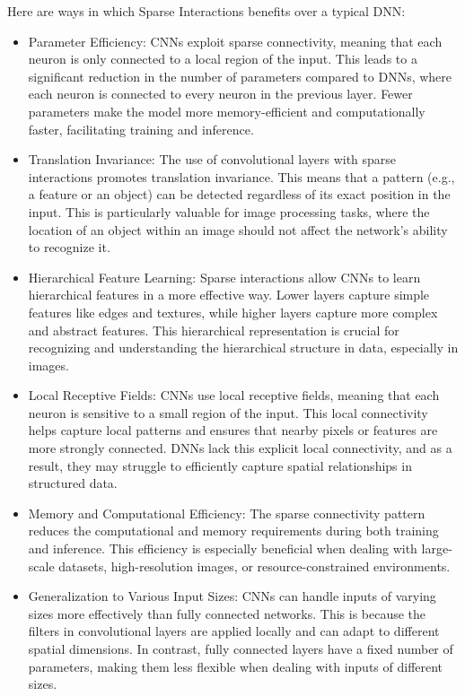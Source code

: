 \documentclass{report}
\begin{document}
Here are ways in which Sparse Interactions benefits over a typical DNN:
\begin{itemize}
\item Parameter Efficiency:
CNNs exploit sparse connectivity, meaning that each neuron is only connected to a local region of the input. This leads to a significant reduction in the number of parameters compared to DNNs, where each neuron is connected to every neuron in the previous layer. Fewer parameters make the model more memory-efficient and computationally faster, facilitating training and inference.

\item Translation Invariance:
The use of convolutional layers with sparse interactions promotes translation invariance. This means that a pattern (e.g., a feature or an object) can be detected regardless of its exact position in the input. This is particularly valuable for image processing tasks, where the location of an object within an image should not affect the network's ability to recognize it.

\item Hierarchical Feature Learning:
Sparse interactions allow CNNs to learn hierarchical features in a more effective way. Lower layers capture simple features like edges and textures, while higher layers capture more complex and abstract features. This hierarchical representation is crucial for recognizing and understanding the hierarchical structure in data, especially in images.

\item Local Receptive Fields:
CNNs use local receptive fields, meaning that each neuron is sensitive to a small region of the input. This local connectivity helps capture local patterns and ensures that nearby pixels or features are more strongly connected. DNNs lack this explicit local connectivity, and as a result, they may struggle to efficiently capture spatial relationships in structured data.

\item Memory and Computational Efficiency:
The sparse connectivity pattern reduces the computational and memory requirements during both training and inference. This efficiency is especially beneficial when dealing with large-scale datasets, high-resolution images, or resource-constrained environments.

\item Generalization to Various Input Sizes:
CNNs can handle inputs of varying sizes more effectively than fully connected networks. This is because the filters in convolutional layers are applied locally and can adapt to different spatial dimensions. In contrast, fully connected layers have a fixed number of parameters, making them less flexible when dealing with inputs of different sizes.


\end{itemize}
\end{document}
